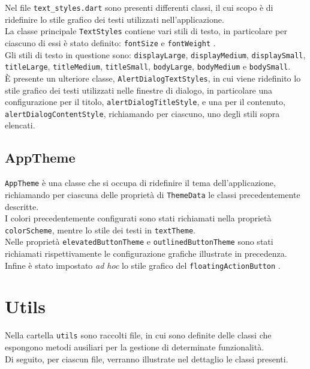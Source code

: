 Nel file \lstinline{text_styles.dart} sono presenti differenti classi, il cui scopo è di ridefinire lo stile grafico dei testi utilizzati nell'applicazione. \\
La classe principale \lstinline{TextStyles} contiene vari stili di testo, in particolare per ciascuno di essi è stato definito: \lstinline{fontSize} \cite{site:font-size} e \lstinline{fontWeight} \cite{site:font-weight}. \\
Gli stili di testo \cite{site:text-theme} in questione sono:
 \lstinline{displayLarge},
 \lstinline{displayMedium},
 \lstinline{displaySmall},
 \lstinline{titleLarge},
 \lstinline{titleMedium},
 \lstinline{titleSmall},
 \lstinline{bodyLarge},
 \lstinline{bodyMedium} e
 \lstinline{bodySmall}. \\
 È presente un ulteriore classe, \lstinline{AlertDialogTextStyles}, in cui viene ridefinito lo stile grafico dei testi utilizzati nelle finestre di dialogo, in particolare una configurazione per il titolo, \lstinline{alertDialogTitleStyle}, e una per il contenuto, \lstinline{alertDialogContentStyle}, richiamando per ciascuno, uno degli stili sopra elencati.

 \subsection{AppTheme}
\label{subsec:app-theme}

\lstinline{AppTheme} è una classe che si occupa di ridefinire il tema dell'applicazione, richiamando per ciascuna delle proprietà di \lstinline{ThemeData} \cite{site:theme-data-class} le classi precedentemente descritte. \\
I colori precedentemente configurati sono stati richiamati nella proprietà \lstinline{colorScheme}, mentre lo stile dei testi in \lstinline{textTheme}. \\
Nelle proprietà \lstinline{elevatedButtonTheme} e \lstinline{outlinedButtonTheme} sono stati richiamati rispettivamente le configurazione grafiche illustrate in precedenza.\\
Infine è stato impostato \emph{ad hoc} lo stile grafico del \lstinline{floatingActionButton} \cite{site:fab}.

\section{Utils}
\label{sec:utils}

Nella cartella \lstinline{utils} sono raccolti file, in cui sono definite delle classi che espongono metodi ausiliari per la gestione di determinate funzionalità. \\
Di seguito, per ciascun file, verranno illustrate nel dettaglio le classi presenti.


